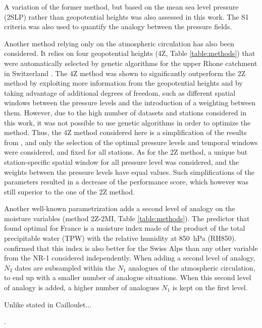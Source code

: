\documentclass{ametsoc}
\begin{document}
A variation of the former method, but based on the mean sea level pressure (2SLP) rather than geopotential heights was also assessed in this work. The S1 criteria was also used to quantify the analogy between the pressure fields.

Another method relying only on the atmospheric circulation has also been considered. It relies on four geopotential heights (4Z, Table \ref{table:methods}) that were automatically selected by genetic algorithms for the upper Rhone catchment in Switzerland \citep{Horton2017b}. The 4Z method was shown to significantly outperform the 2Z method by exploiting more information from the geopotential heights and by taking advantage of additional degrees of freedom, such as different spatial windows between the pressure levels and the introduction of a weighting between them. However, due to the high number of datasets and stations considered in this work, it was not possible to use genetic algorithms in order to optimize the method. Thus, the 4Z method considered here is a simplification of the results from \citet{Horton2017b}, and only the selection of the optimal pressure levels and temporal windows were considered, and fixed for all stations. As for the 2Z method, a unique but station-specific spatial window for all pressure level was considered, and the weights between the pressure levels have equal values. Such simplifications of the parameters resulted in a decrease of the performance score, which however was still superior to the one of the 2Z method.

Another well-known parametrization adds a second level of analogy on the moisture variables (method 2Z-2MI, Table \ref{table:methods}). The predictor that \citet{Bontron2004} found optimal for France is a moisture index made of the product of the total precipitable water (TPW) with the relative humidity at 850~hPa (RH850). \cite{Horton2012a} confirmed that this index is also better for the Swiss Alps than any other variable from the NR-1 considered independently. When adding a second level of analogy, $N_{2}$ dates are subsampled within the $N_{1}$ analogues of the atmospheric circulation, to end up with a smaller number of analogue situations. When this second level of analogy is added, a higher number of analogues $N_{1}$ is kept on the first level.



Unlike stated in Cailloulet...





\citep{Obled2002, Bontron2005, Marty2012}.
\end{document}
